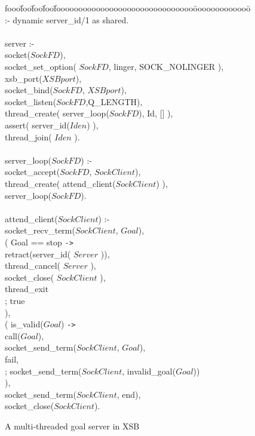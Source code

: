 \begin{figure}
\begin{center}
\begin{tt}
\begin{tabbing}
fooo\=foo\=foo\=foo\=fooooooooooooooooooooooooooooooo\=ooooooooooooo\=\kill
\> :- dynamic server\_id/1 as shared. \\
\\
\> server :-\\
\> \> socket($SockFD$),\\
\> \> socket\_set\_option( $SockFD$, linger, SOCK\_NOLINGER ),\\
\> \> xsb\_port($XSBport$),\\
\> \> socket\_bind($SockFD$, $XSBport$),\\
\> \> socket\_listen($SockFD$,Q\_LENGTH),\\
\> \> thread\_create( server\_loop($SockFD$), Id, [] ),\\
\> \> assert( server\_id($Iden$) ),\\
\> \> thread\_join( $Iden$ ).\\
\\
\> server\_loop($SockFD$) :-\\
\> \> socket\_accept($SockFD$, $SockClient$),\\
\> \> thread\_create( attend\_client($SockClient$) ),\\
\> \> server\_loop($SockFD$).\\
\\
\> attend\_client($SockClient$) :-\\
\> \> socket\_recv\_term($SockClient$, $Goal$),\\
\> \> ( \> Goal == stop \verb|->| \\
\> \> \> retract(server\_id( $Server$ )),\\
\> \> \> thread\_cancel( $Server$ ),\\
\> \> \> socket\_close( $SockClient$ ),\\
\> \> \> thread\_exit\\
\> \> ; \> true\\
\> \> ),\\
\> \> ( \> is\_valid($Goal$) \verb|->|\\
\> \> \> call($Goal$), \\
\> \> \> socket\_send\_term($SockClient$, $Goal$),\\
\> \> \> fail,\\
\> \> ;	\> socket\_send\_term($SockClient$, invalid\_goal($Goal$))\\
\> \> ),\\
\> \> socket\_send\_term($SockClient$, end),\\
\> \> socket\_close($SockClient$).
\end{tabbing}
\end{tt}
\end{center}
\caption{A multi-threaded goal server in XSB}
\label{fig:ex-server}
\end{figure}

